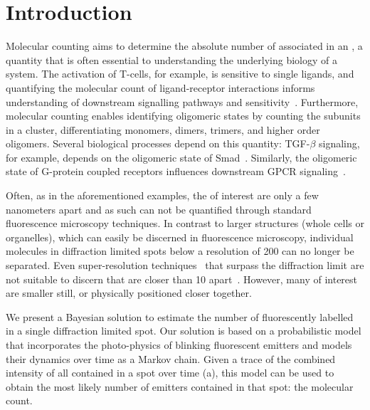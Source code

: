 \section{Introduction}



%
Molecular counting aims to determine the absolute number of \smallobjects
associated in an \object, a quantity that is often essential to understanding
the underlying biology of a system.
  The activation of T-cells, for example, is sensitive to single ligands, and
  quantifying the molecular count of ligand-receptor interactions informs
  understanding of downstream signalling pathways and
  sensitivity~\citep{irvine_2002}.
  Furthermore, molecular counting enables identifying oligomeric states by
  counting the subunits in a cluster, differentiating monomers, dimers,
  trimers, and higher order oligomers.
  Several biological processes depend on this quantity: TGF-$\beta$ signaling,
  for example, depends on the oligomeric state of Smad~\citep{inman_2002,
  moustakas_2002}.
  Similarly, the oligomeric state of G-protein coupled receptors influences
  downstream GPCR signaling~\citep{felce_2018, breitwieser_2004}.

%
Often, as in the aforementioned examples, the \smallobjects of interest are only a few
nanometers apart and as such can not be quantified through standard fluorescence
microscopy techniques.
  In contrast to larger structures (whole cells or organelles), which can
  easily be discerned in fluorescence microscopy, individual molecules in
  diffraction limited spots below a resolution of 200 \nanometer can no longer
  be separated.
  Even super-resolution techniques~\citep{betzig_2006,rust_2006} that surpass
  the diffraction limit are not suitable to discern \smallobjects that are
  closer than 10 \nanometer apart~\citep{valli_seeing_2021}.
  However, many \objects of interest are smaller still, or physically
  positioned closer together.

%
We present a Bayesian solution to estimate the number of fluorescently labelled
\smallobjects in a single diffraction limited spot.
  Our solution is based on a probabilistic model that incorporates the
  photo-physics of blinking fluorescent emitters and models their dynamics over
  time as a Markov chain.
  Given a trace of the combined intensity of all \smallobjects contained in a
  spot over time (a), this model can be used to obtain the 
  most likely number of emitters contained in that spot: the molecular count.

